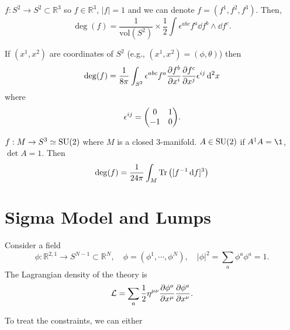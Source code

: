 \documentclass[a4paper,11pt]{article}
\begin{document}
    \begin{ex}
        $f: S^2 \to S^2 \subset \mathbb{R}^3$ so $f \in \mathbb{R}^3$, $|f|=1$ and we can denote $f=(f^1,f^2,f^3)$. Then, 
        \begin{equation}
            \deg(f) = \frac{1}{\text{vol}(S^2)} \times \frac{1}{2} \int \epsilon^{abc} f^a \dd{f^b} \wedge \dd{f^c}. \label{eq:S2-S2}
        \end{equation}

        If $(x^1,x^2)$ are coordinates of $S^2$ (e.g., $(x^1,x^2) = (\phi,\theta)$) then 
        \begin{equation}
            \deg(f) = \frac{1}{8 \pi} \int_{S^2} \epsilon^{abc} f^a \pdv{f^b}{x^i} \pdv{f^c}{x^j} \epsilon^{ij} \dd[2]{x}
        \end{equation}
        where 
        \begin{equation}
            \epsilon^{ij} = \mqty(0 & 1\\-1 & 0).
        \end{equation}
    \end{ex}
    \begin{ex}
        $f: M \to S^3 \simeq \operatorname{SU}(2)$ where $M$ is a closed 3-manifold. $A \in \operatorname{SU}(2)$ if $A^{\dagger} A = \1$, $\det A = 1$. Then 
        \begin{equation}
            \deg(f) = \frac{1}{24 \pi} \int_M \Tr\left( [f^{-1} \dd{f}]^3 \right) \label{eq:su-2}
        \end{equation}
    \end{ex}
    \newpage 
    \section{Sigma Model and Lumps}
    Consider a field 
    \begin{equation}
        \phi : \mathbb{R}^{2,1} \to S^{N-1} \subset \mathbb{R}^N, \quad \phi = (\phi^1,\cdots,\phi^N), \quad |\phi|^2 = \sum_a \phi^a \phi^a = 1.
    \end{equation}
    The Lagrangian density of the theory is 
    \begin{equation}
        \mathcal{L} = \sum_a \frac{1}{2} \eta^{\mu \nu} \pdv{\phi^a}{x^\mu} \pdv{\phi^a}{x^\nu}.
    \end{equation}

    To treat the constraints, we can either 
    
\end{document}
